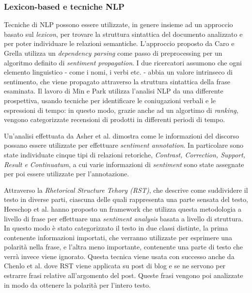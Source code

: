 \documentclass[a4paper,12pt,openright,twoside]{report}
\theoremstyle{definition}
\begin{document}
\subsubsection{Lexicon-based e tecniche NLP}
Tecniche di NLP possono essere utilizzate, in genere insieme ad un approccio basato sul \emph{lexicon}, per 
trovare la struttura sintattica del documento analizzato e per poter individuare le relazioni semantiche.
L'approccio proposto da Caro e Grella %
utilizza un \emph{dependency parsing} come passo di preprocessing per un algoritmo definito di \emph{sentiment propagation}.
I due ricercatori assumono che ogni elemento linguistico - come i nomi, i verbi etc. - abbia un valore intrinseco di
sentimento, che viene propagato attraverso la struttura sintattica della frase esaminata.
Il lavoro di Min e Park %
utilizza l'analisi NLP da una differente prospettiva, usando tecniche per identificare le coniugazioni
verbali e le espressioni di tempo: in questo modo, grazie anche ad un algortimo di \emph{ranking}, vengono categorizzate
recensioni di prodotti in differenti periodi di tempo.

Un'analisi effettuata da Asher et al. %
dimostra come le informazioni del discorso possano essere utilizzate per effettuare \emph{sentiment annotation}. In particolare
sono state individuate cinque tipi di relazioni retoriche, \emph{Contrast, Correction, Support, Result e Continuatum},
a cui varie informazioni di \emph{sentiment} sono state assegnate per poi essere utilizzate per l'annotazione.

Attraverso la \emph{Rhetorical Structure Tehory (RST)}, che descrive come suddividere il testo in diverse parti, ciascuna
delle quali rappresenta una parte sensata del testo, Heeschop et al. %
hanno proposto un framework che utilizza questa metodologia  a livello di frase per effettuare una \emph{sentiment analysis}
basata a livello di struttura. In questo modo è stato categorizzato il testo in due classi distinte, la prima
contenente
informazioni importati, che verranno utilizzate per esprimere una polarità nella frase, e l'altra 
meno importante, contenente una parte di testo che verrà
invece viene ignorato.
Questa tecnica viene usata con successo anche da Chenlo et al. %
dove RST viene applicata su post di blog e se ne servono per estrarre frasi relative all'argomento del post. Queste frasi
vengono poi analizzate in modo da ottenere la polarità per l'intero testo.
\end{document}
